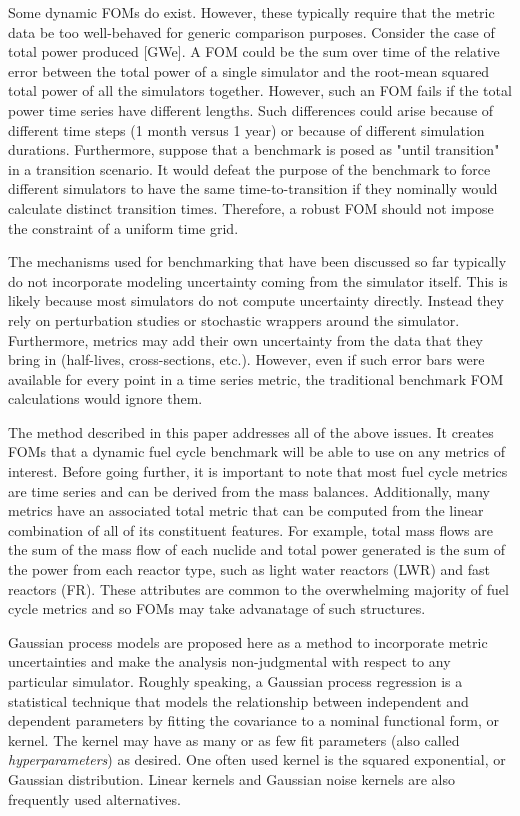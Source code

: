 Some dynamic FOMs do exist. However, these typically require that the metric
data be too well-behaved for generic comparison purposes. Consider the case 
of total power produced [GWe]. A FOM could be the sum over time of the relative error 
between the total power of a single simulator and the root-mean squared total power
of all the simulators together. However, such an FOM fails if the total power
time series have different lengths. Such differences could arise because 
of different time steps (1 month versus 1 year) or because of different 
simulation durations. Furthermore, suppose that a benchmark is posed as 
"until transition" in a transition scenario. It would defeat the purpose of 
the benchmark to force different simulators to have the same 
time-to-transition if they nominally would calculate distinct transition 
times. Therefore, a robust FOM should not impose the constraint of a uniform time grid.
 
The mechanisms used for benchmarking that have been discussed so far typically
do not incorporate modeling uncertainty coming from the simulator itself.
This is likely because most simulators do not compute uncertainty directly. 
Instead they rely on perturbation studies or stochastic wrappers around 
the simulator. Furthermore, metrics may add their own uncertainty from the 
data that they bring in (half-lives, cross-sections, etc.). 
However, even if such error bars were available for
every point in a time series metric, the traditional benchmark FOM 
calculations would ignore them.

The method described in this paper addresses all of the above issues. It 
creates FOMs that a dynamic fuel cycle benchmark will be able to use on any 
metrics of interest. Before going further, it is important to note that 
most fuel cycle 
metrics are time series and can be derived from the mass balances. 
Additionally, many metrics have an associated total metric that can be 
computed from the linear combination of all of its constituent features. 
For example, total mass flows are the sum of the mass flow of each nuclide
and total power generated is the sum of the power from each reactor type, 
such as light water reactors (LWR) and fast reactors (FR). These attributes 
are common to the overwhelming majority of fuel cycle metrics and so FOMs
may take advanatage of such structures.

Gaussian process models are proposed here as a method to incorporate 
metric uncertainties and make the analysis non-judgmental with respect to 
any particular
simulator. Roughly speaking, a Gaussian process regression is a 
statistical technique
that models the relationship between independent and dependent parameters
by fitting the covariance to a nominal functional form, or kernel.
The kernel may have as many or as few fit parameters (also called 
\emph{hyperparameters}) as desired. One often used kernel is the squared 
exponential, or Gaussian distribution. Linear kernels and Gaussian
noise kernels are also frequently used alternatives. 

